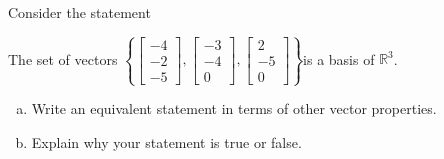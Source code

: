 
\begin{exerciseStatement}


Consider the statement 
\begin{center}\begin{minipage}{0.8\textwidth}
 The set of vectors \( \left\{ \left[\begin{array}{c}
-4 \\
-2 \\
-5
\end{array}\right] , \left[\begin{array}{c}
-3 \\
-4 \\
0
\end{array}\right] , \left[\begin{array}{c}
2 \\
-5 \\
0
\end{array}\right] \right\} \)is a basis of \(\mathbb{R}^3\). 
\end{minipage}\end{center}
    


\begin{enumerate}[(a)]
\item  Write an equivalent statement in terms of other vector properties.
\item  Explain why your statement is true or false.
\end{enumerate}
    
\end{exerciseStatement}
    
